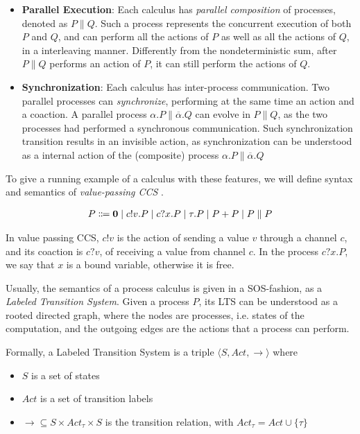 \begin{itemize}
\item \textbf{Parallel Execution}: Each calculus has \textit{parallel composition} of processes, denoted as $P \parallel Q$. Such a process represents the concurrent execution of both $P$ and $Q$, and can perform all the actions of $P$ as well as all the actions of $Q$, in a interleaving manner. Differently from the nondeterministic sum, after $P\parallel Q$ performs an action of $P$, it can still perform the actions of $Q$.
\item \textbf{Synchronization}: Each calculus has inter-process communication. Two parallel processes can \textit{synchronize}, performing at the same time an action and a coaction. A parallel process $\alpha.P \parallel \overline{\alpha}.Q$ can evolve in $P \parallel Q$, as the two processes had performed a synchronous communication. Such synchronization transition results in an invisible action, as synchronization can be understood as a internal action of the (composite) process $\alpha.P \parallel \overline{\alpha}.Q$ 

\end{itemize}

To give a running example of a calculus with these features, we will define syntax and semantics of \textit{value-passing CCS} \cite{hennessyTheoryCommunicatingProcesses1993}.

\begin{align*}
  P \Coloneqq \mathbf{0} \mid c!v. P \mid c?x.P \mid \tau.P \mid P + P \mid P \parallel P
\end{align*}	

In value passing CCS, $c!v$ is the action of sending a value $v$ through a channel $c$, and its coaction is $c?v$, of receiving a value from channel $c$. In the process $c?x.P$, we say that $x$ is a bound variable, otherwise it is free.

Usually, the semantics of a process calculus is given in a SOS-fashion, as a \textit{Labeled Transition System}. Given a process $P$, its LTS can be understood as a rooted directed graph, where the nodes are processes, i.e. states of the computation, and the outgoing edges are the actions that a process can perform.

Formally, a Labeled Transition System is a triple $\langle S , Act, \rightarrow \rangle$ where \begin{itemize}
\item $S$ is a set of states
\item $Act$ is a set of transition labels
\item $\rightarrow 	\subseteq S\times Act_\tau \times S$ is the transition relation, with $Act_\tau = Act \cup \{\tau\}$
\end{itemize} 

